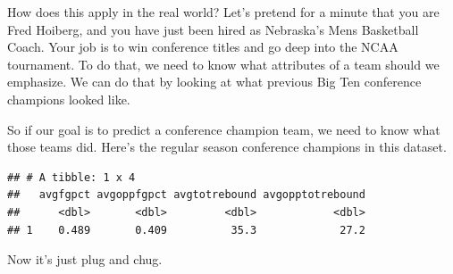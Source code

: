 \documentclass[]{book}
\newenvironment{Shaded}{\begin{snugshade}}{\end{snugshade}}
\newcommand{\KeywordTok}[1]{\textcolor[rgb]{0.13,0.29,0.53}{\textbf{#1}}}
\newcommand{\DataTypeTok}[1]{\textcolor[rgb]{0.13,0.29,0.53}{#1}}
\newcommand{\StringTok}[1]{\textcolor[rgb]{0.31,0.60,0.02}{#1}}
\newcommand{\OperatorTok}[1]{\textcolor[rgb]{0.81,0.36,0.00}{\textbf{#1}}}
\newcommand{\NormalTok}[1]{#1}
\begin{document}
How does this apply in the real world? Let's pretend for a minute that
you are Fred Hoiberg, and you have just been hired as Nebraska's Mens
Basketball Coach. Your job is to win conference titles and go deep into
the NCAA tournament. To do that, we need to know what attributes of a
team should we emphasize. We can do that by looking at what previous Big
Ten conference champions looked like.

So if our goal is to predict a conference champion team, we need to know
what those teams did. Here's the regular season conference champions in
this dataset.

\begin{Shaded}
\end{Shaded}

\begin{verbatim}
## # A tibble: 1 x 4
##   avgfgpct avgoppfgpct avgtotrebound avgopptotrebound
##      <dbl>       <dbl>         <dbl>            <dbl>
## 1    0.489       0.409          35.3             27.2
\end{verbatim}

Now it's just plug and chug.
\end{document}
